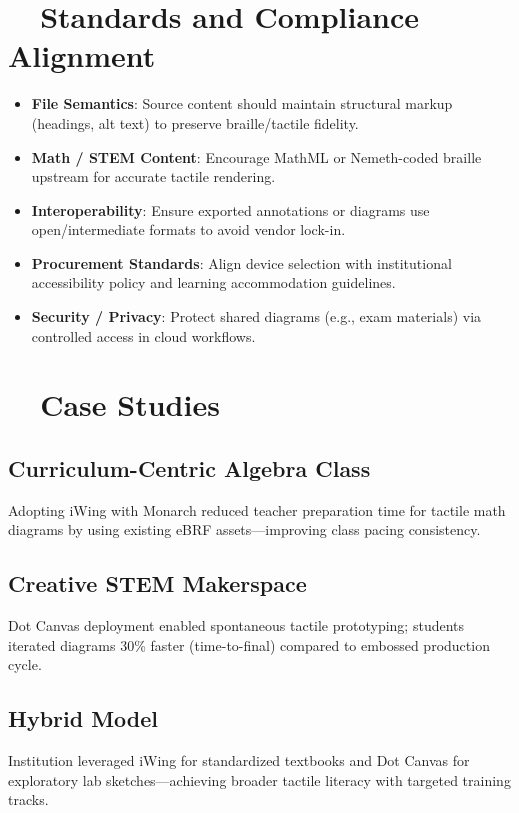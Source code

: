 \section{~~Standards and Compliance Alignment}
\label{sec:sr29-standards}
\begin{itemize}
	\item \textbf{File Semantics}: Source content should maintain structural markup (headings, alt text) to preserve braille/tactile fidelity.
	\item \textbf{Math / STEM Content}: Encourage MathML or Nemeth-coded braille upstream for accurate tactile rendering.
	\item \textbf{Interoperability}: Ensure exported annotations or diagrams use open/intermediate formats to avoid vendor lock-in.
	\item \textbf{Procurement Standards}: Align device selection with institutional accessibility policy and learning accommodation guidelines.
	\item \textbf{Security / Privacy}: Protect shared diagrams (e.g., exam materials) via controlled access in cloud workflows.
\end{itemize}

\section{~~Case Studies}
\label{sec:sr29-case-studies}
\subsection*{Curriculum-Centric Algebra Class}
Adopting iWing with Monarch reduced teacher preparation time for tactile math diagrams by using existing eBRF assets—improving class pacing consistency\supercite{paths_monarch}.

\subsection*{Creative STEM Makerspace}
Dot Canvas deployment enabled spontaneous tactile prototyping; students iterated diagrams 30\% faster (time-to-final) compared to embossed production cycle\supercite{ces_dotcanvas}.

\subsection*{Hybrid Model}
Institution leveraged iWing for standardized textbooks and Dot Canvas for exploratory lab sketches—achieving broader tactile literacy with targeted training tracks.


